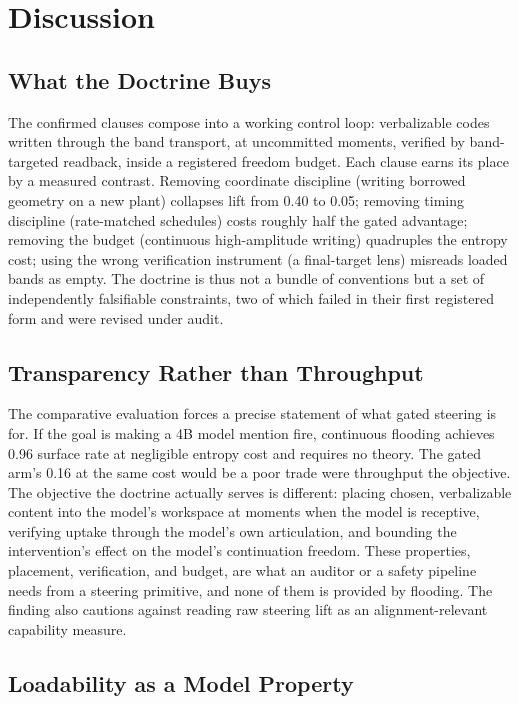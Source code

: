 \section{Discussion}
\label{sec:discussion}

\subsection{What the Doctrine Buys}

The confirmed clauses compose into a working control loop: verbalizable codes written through the band transport, at uncommitted moments, verified by band-targeted readback, inside a registered freedom budget. Each clause earns its place by a measured contrast. Removing coordinate discipline (writing borrowed geometry on a new plant) collapses lift from 0.40 to 0.05; removing timing discipline (rate-matched schedules) costs roughly half the gated advantage; removing the budget (continuous high-amplitude writing) quadruples the entropy cost; using the wrong verification instrument (a final-target lens) misreads loaded bands as empty. The doctrine is thus not a bundle of conventions but a set of independently falsifiable constraints, two of which failed in their first registered form and were revised under audit.

\subsection{Transparency Rather than Throughput}

The comparative evaluation forces a precise statement of what gated steering is for. If the goal is making a 4B model mention fire, continuous flooding achieves 0.96 surface rate at negligible entropy cost and requires no theory. The gated arm's 0.16 at the same cost would be a poor trade were throughput the objective. The objective the doctrine actually serves is different: placing chosen, verbalizable content into the model's workspace at moments when the model is receptive, verifying uptake through the model's own articulation, and bounding the intervention's effect on the model's continuation freedom. These properties, placement, verification, and budget, are what an auditor or a safety pipeline needs from a steering primitive, and none of them is provided by flooding. The finding also cautions against reading raw steering lift as an alignment-relevant capability measure.

\subsection{Loadability as a Model Property}

